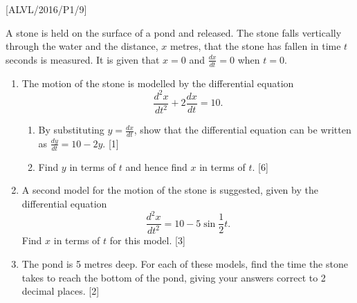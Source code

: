\item {[}ALVL/2016/P1/9{]}

A stone is held on the surface of a pond and released. The stone falls
vertically through the water and the distance, $x$ metres, that the
stone has fallen in time $t$ seconds is measured. It is given that
$x=0$ and $\frac{dx}{dt}=0$ when $t=0$. 
\begin{enumerate}
\item The motion of the stone is modelled by the differential equation 
\[
\frac{d^{2}x}{dt^{2}}+2\frac{dx}{dt}=10.
\]

\begin{enumerate}
\item By substituting $y=\frac{dx}{dt}$, show that the differential equation
can be written as $\frac{dy}{dt}=10-2y$. \hfill{}{[}1{]}
\item Find $y$ in terms of $t$ and hence find $x$ in terms of $t$. \hfill{}{[}6{]}
\end{enumerate}
\item A second model for the motion of the stone is suggested, given by
the differential equation 
\[
\frac{d^{2}x}{dt^{2}}=10-5\sin\frac{1}{2}t.
\]
Find $x$ in terms of $t$ for this model. \hfill{} {[}3{]}
\item The pond is 5 metres deep. For each of these models, find the time
the stone takes to reach the bottom of the pond, giving your answers
correct to 2 decimal places. \hfill{}{[}2{]}
\end{enumerate}
